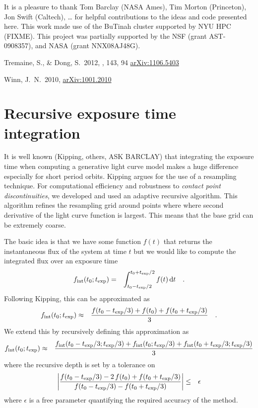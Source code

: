 \documentclass[12pt,preprint]{aastex}
\begin{document}
\acknowledgments
It is a pleasure to thank
    Tom Barclay (NASA Ames),
    Tim Morton (Princeton),
    Jon Swift (Caltech),
    \ldots
for helpful contributions to the ideas and code presented here.
This work made use of the BuTinah cluster supported by NYU HPC (FIXME).
This project was partially supported by the NSF (grant AST-0908357), and NASA
(grant NNX08AJ48G).

\newcommand{\arxiv}[1]{\href{http://arxiv.org/abs/#1}{arXiv:#1}}
\begin{thebibliography}{}\raggedright

Tremaine, S., \& Dong, S.\ 2012, \aj, 143, 94
\arxiv{1106.5403}

Winn, J.~N.\ 2010, \arxiv{1001.2010}

\end{thebibliography}

\appendix

\section{Recursive exposure time integration}

It is well known (Kipping, others, ASK BARCLAY) that integrating the
exposure time when computing a generative light curve model makes a huge
difference especially for short period orbits.
Kipping argues for the use of a resampling technique.
For computational efficiency and robustness to \emph{contact point
discontinuities}, we developed and used an adaptive recursive algorithm.
This algorithm refines the resampling grid around points where where second
derivative of the light curve function is largest.
This means that the base grid can be extremely coarse.

The basic idea is that we have some function $f(t)$ that returns the
instantaneous flux of the system at time $t$ but we would like to compute the
integrated flux over an exposure time \texp
\begin{eqnarray}
f_\mathrm{int}(t_0;{t_\mathrm{exp}}) &=& \int_{t_0-{t_\mathrm{exp}}/2}^{t_0+{t_\mathrm{exp}}/2} f(t) \,\mathrm{d} t
    \quad.
\end{eqnarray}
Following Kipping, this can be approximated as
\begin{eqnarray}
f_\mathrm{int}(t_0;{t_\mathrm{exp}}) &\approx&
    \frac{f(t_0-{t_\mathrm{exp}}/3)+f(t_0)+f(t_0+{t_\mathrm{exp}}/3)}{3} \quad.
\end{eqnarray}
We extend this by recursively defining this approximation as
\begin{eqnarray}
f_\mathrm{int}(t_0;{t_\mathrm{exp}}) &\approx&
    \frac{f_\mathrm{int}(t_0-{t_\mathrm{exp}}/3;{t_\mathrm{exp}}/3)+f_\mathrm{int}(t_0;{t_\mathrm{exp}}/3)
          +f_\mathrm{int}(t_0+{t_\mathrm{exp}}/3;{t_\mathrm{exp}}/3)}{3}
\end{eqnarray}
where the recursive depth is set by a tolerance on
\begin{eqnarray}
\left | \frac{f(t_0-{t_\mathrm{exp}}/3)-2\,f(t_0)+f(t_0+{t_\mathrm{exp}}/3)}
             {f(t_0-{t_\mathrm{exp}}/3)-f(t_0+{t_\mathrm{exp}}/3)} \right | &\le& \epsilon
\end{eqnarray}
where $\epsilon$ is a free parameter quantifying the required accuracy of the
method.
\end{document}
